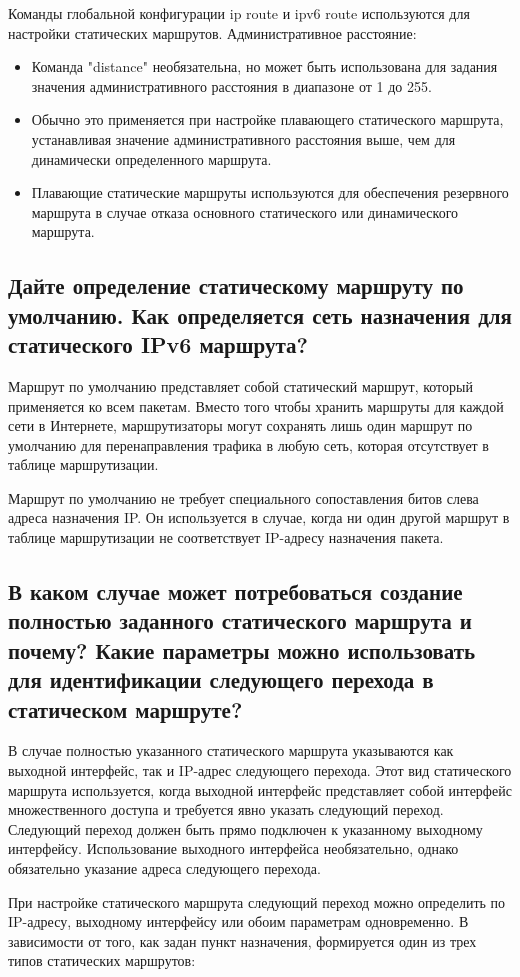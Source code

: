 Команды глобальной конфигурации ip route и ipv6 route используются
для настройки статических маршрутов.
Административное расстояние:

\begin{itemize}
    \item Команда "distance" необязательна,
    но может быть использована для задания значения административного
    расстояния в диапазоне от 1 до 255.
    \item Обычно это применяется при настройке плавающего
    статического маршрута, устанавливая значение административного
    расстояния выше, чем для динамически определенного маршрута.
    \item Плавающие статические маршруты используются
    для обеспечения резервного маршрута в случае отказа основного
    статического или динамического маршрута.
\end{itemize}

\subsection{Дайте определение статическому маршруту по умолчанию.
Как определяется сеть назначения для статического IPv6 маршрута?}

Маршрут по умолчанию представляет собой статический маршрут,
который применяется ко всем пакетам.
Вместо того чтобы хранить маршруты для каждой сети в Интернете,
маршрутизаторы могут сохранять лишь один маршрут по умолчанию
для перенаправления трафика в любую сеть,
которая отсутствует в таблице маршрутизации.\par
Маршрут по умолчанию не требует специального сопоставления битов
слева адреса назначения IP. Он используется в случае,
когда ни один другой маршрут в таблице маршрутизации не соответствует
IP-адресу назначения пакета.

\subsection{В каком случае может потребоваться создание полностью заданного
статического маршрута и почему?
Какие параметры можно использовать для идентификации следующего перехода
в статическом маршруте?}

В случае полностью указанного статического маршрута указываются
как выходной интерфейс, так и IP-адрес следующего перехода.
Этот вид статического маршрута используется,
когда выходной интерфейс представляет собой интерфейс множественного доступа
и требуется явно указать следующий переход.
Следующий переход должен быть прямо подключен
к указанному выходному интерфейсу.
Использование выходного интерфейса необязательно, однако
обязательно указание адреса следующего перехода.\par
При настройке статического маршрута следующий переход можно определить
по IP-адресу, выходному интерфейсу или обоим параметрам одновременно.
В зависимости от того, как задан пункт назначения,
формируется один из трех типов статических маршрутов:

